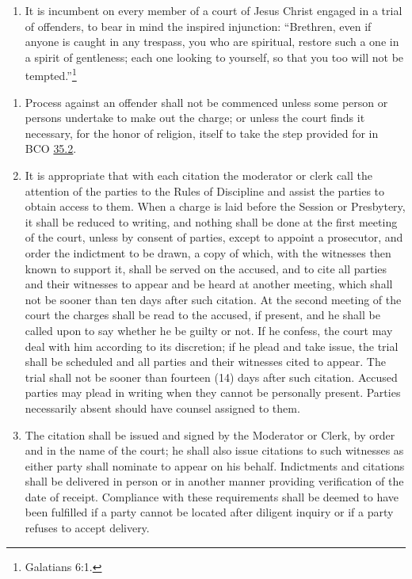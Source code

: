 \documentclass[
]{book}
\providecommand{\tightlist}{%
  \setlength{\itemsep}{0pt}\setlength{\parskip}{0pt}}
\begin{document}
\protect\hypertarget{chapter-slug-36-general-provisions-applicable-to-all-cases-of-process}{\href{}{}}

\begin{enumerate}
\def\labelenumi{\arabic{enumi}.}
\tightlist
\item
  \protect\hypertarget{36}{\href{}{}}It is incumbent on every member of a court of Jesus Christ engaged in a trial of offenders, to bear in mind the inspired injunction: ``Brethren, even if anyone is caught in any trespass, you who are spiritual, restore such a one in a spirit of gentleness; each one looking to yourself, so that you too will not be tempted.''\footnote{Galatians 6:1.}
\end{enumerate}

\begin{enumerate}
\def\labelenumi{\arabic{enumi}.}
\setcounter{enumi}{1}
\tightlist
\item
  Process against an offender shall not be commenced unless some person or persons undertake to make out the charge; or unless the court finds it necessary, for the honor of religion, itself to take the step provided for in BCO \protect\hyperlink{35.2}{35.2}.
\item
  It is appropriate that with each citation the moderator or clerk call the attention of the parties to the Rules of Discipline and assist the parties to obtain access to them. When a charge is laid before the Session or Presbytery, it shall be reduced to writing, and nothing shall be done at the first meeting of the court, unless by consent of parties, except to appoint a prosecutor, and order the indictment to be drawn, a copy of which, with the witnesses then known to support it, shall be served on the accused, and to cite all parties and their witnesses to appear and be heard at another meeting, which shall not be sooner than ten days after such citation. At the second meeting of the court the charges shall be read to the accused, if present, and he shall be called upon to say whether he be guilty or not. If he confess, the court may deal with him according to its discretion; if he plead and take issue, the trial shall be scheduled and all parties and their witnesses cited to appear. The trial shall not be sooner than fourteen (14) days after such citation. Accused parties may plead in writing when they cannot be personally present. Parties necessarily absent should have counsel assigned to them.
\item
  The citation shall be issued and signed by the Moderator or Clerk, by order and in the name of the court; he shall also issue citations to such witnesses as either party shall nominate to appear on his behalf. Indictments and citations shall be delivered in person or in another manner providing verification of the date of receipt. Compliance with these requirements shall be deemed to have been fulfilled if a party cannot be located after diligent inquiry or if a party refuses to accept delivery.

\end{enumerate}
\end{document}
